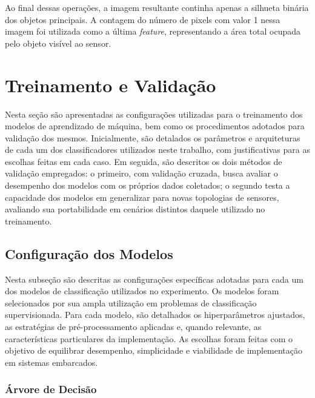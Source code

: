 Ao final dessas operações, a imagem resultante continha apenas a silhueta binária dos objetos principais. A contagem do número de pixels com valor 1 nessa imagem foi utilizada como a última \textit{feature}, representando a área total ocupada pelo objeto visível ao sensor.


\section{Treinamento e Validação}

Nesta seção são apresentadas as configurações utilizadas para o treinamento dos modelos de aprendizado de máquina, bem como os procedimentos adotados para validação dos mesmos. Inicialmente, são detalados os parâmetros e arquiteturas de cada um dos classificadores utilizados neste trabalho, com justificativas para as escolhas feitas em cada caso. Em seguida, são descritos os dois métodos de validação empregados: o primeiro, com validação cruzada, busca avaliar o desempenho dos modelos com os próprios dados coletados; o segundo testa a capacidade dos modelos em generalizar para novas topologias de sensores, avaliando sua portabilidade em cenários distintos daquele utilizado no treinamento.

\subsection{Configuração dos Modelos}

Nesta subseção são descritas as configurações específicas adotadas para cada um dos modelos de classificação utilizados no experimento. Os modelos foram selecionados por sua ampla utilização em problemas de classificação supervisionada. Para cada modelo, são detalhados os hiperparâmetros ajustados, as estratégias de pré-processamento aplicadas e, quando relevante, as características particulares da implementação. As escolhas foram feitas com o objetivo de equilibrar desempenho, simplicidade e viabilidade de implementação em sistemas embarcados.

\subsubsection{Árvore de Decisão}

